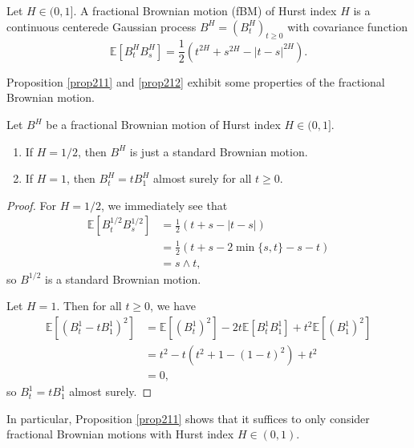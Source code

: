 \begin{defn}
    Let $H\in (0,1]$. A fractional Brownian motion (fBM) of Hurst index $H$ is a continuous centerede Gaussian process $B^{H}=(B_{t}^{H})_{t\geq 0}$ with covariance function
    \begin{equation}
        \mathbb{E}[B_{t}^{H}B_{s}^{H}]=\frac{1}{2}\left(t^{2H}+s^{2H}-|t-s|^{2H}\right).
    \end{equation}
\end{defn}
Proposition \ref{prop211} and \ref{prop212} exhibit some properties of the fractional Brownian motion.
\begin{prop}\label{prop211}
    Let $B^{H}$ be a fractional Brownian motion of Hurst index $H\in (0,1]$.
    \begin{enumerate}
        \item If $H=1/2$, then $B^{H}$ is just a standard Brownian motion.
        \item If $H=1$, then $B^{H}_{t}=tB_{1}^{H}$ almost surely for all $t\geq 0$.
    \end{enumerate}
\end{prop}
\begin{proof}
    For $H=1/2$, we immediately see that
    \begin{align}
        \mathbb{E}[B_{t}^{1/2}B_{s}^{1/2}]&=\frac{1}{2}\left(t+s-|t-s|\right)\\
        &= \frac{1}{2}\left(t+s-2 \min\{s,t\}-s-t\right)\\
        &= s\land t,
    \end{align}
    so $B^{1/2}$ is a standard Brownian motion.

    Let $H=1$. Then for all $t\geq 0$, we have
    \begin{align}
        \mathbb{E}\left[(B^{1}_{t}-tB_{1}^{1})^{2}\right]&= \mathbb{E}\left[(B_{t}^{1})^{2}\right]-2t\mathbb{E}\left[B_{t}^{1}B_{1}^{1}\right]+t^{2}\mathbb{E}\left[(B_{1}^{1})^{2}\right]\\
        &= t^{2}-t\left(t^{2}+1-(1-t)^{2}\right)+t^{2}\\
        &= 0,
    \end{align}
    so $B_{t}^{1}=tB_{1}^{1}$ almost surely.
\end{proof}
In particular, Proposition \ref{prop211} shows that it suffices to only consider fractional Brownian motions with Hurst index $H\in (0,1)$.
